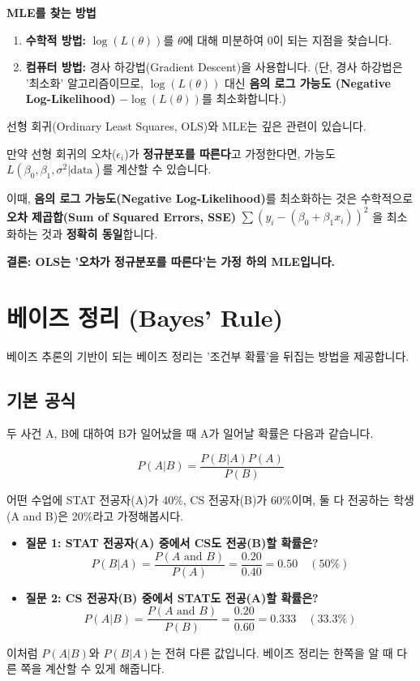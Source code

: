 \documentclass[11pt,a4paper]{book}
\theoremstyle{definition}
\begin{document}
\textbf{MLE를 찾는 방법}
\begin{enumerate}
    \item \textbf{수학적 방법:} $\log(L(\theta))$를 $\theta$에 대해 미분하여 0이 되는 지점을 찾습니다.
    \item \textbf{컴퓨터 방법:} 경사 하강법(Gradient Descent)을 사용합니다.
        (단, 경사 하강법은 '최소화' 알고리즘이므로, $\log(L(\theta))$ 대신 \textbf{음의 로그 가능도 (Negative Log-Likelihood)} $-\log(L(\theta))$를 최소화합니다.)
\end{enumerate}

\begin{summarybox}[title=OLS와 MLE의 중요한 관계]
    선형 회귀(Ordinary Least Squares, OLS)와 MLE는 깊은 관련이 있습니다.

    만약 선형 회귀의 오차($\epsilon_i$)가 \textbf{정규분포를 따른다}고 가정한다면,
    가능도 $L(\beta_0, \beta_1, \sigma^2 | \text{data})$를 계산할 수 있습니다.

    이때, \textbf{음의 로그 가능도(Negative Log-Likelihood)}를 최소화하는 것은
    수학적으로 \textbf{오차 제곱합(Sum of Squared Errors, SSE)} $\sum (y_i - (\beta_0 + \beta_1 x_i))^2$ 을 최소화하는 것과 \textbf{정확히 동일}합니다.

    \textbf{결론: OLS는 '오차가 정규분포를 따른다'는 가정 하의 MLE입니다.}
\end{summarybox}


\section{베이즈 정리 (Bayes' Rule)}

베이즈 추론의 기반이 되는 베이즈 정리는 '조건부 확률'을 뒤집는 방법을 제공합니다.

\subsection{기본 공식}

두 사건 A, B에 대하여 B가 일어났을 때 A가 일어날 확률은 다음과 같습니다.

$$ P(A|B) = \frac{P(B|A) P(A)}{P(B)} $$

\begin{examplebox}[title=CS 전공자 vs. STAT 전공자]
    어떤 수업에 STAT 전공자(A)가 40\%, CS 전공자(B)가 60\%이며, 둘 다 전공하는 학생(A and B)은 20\%라고 가정해봅시다.

    \begin{itemize}
        \item \textbf{질문 1: STAT 전공자(A) 중에서 CS도 전공(B)할 확률은?}
            $$ P(B|A) = \frac{P(A \text{ and } B)}{P(A)} = \frac{0.20}{0.40} = 0.50 \quad (50\%) $$
        \item \textbf{질문 2: CS 전공자(B) 중에서 STAT도 전공(A)할 확률은?}
            $$ P(A|B) = \frac{P(A \text{ and } B)}{P(B)} = \frac{0.20}{0.60} = 0.333 \quad (33.3\%) $$
    \end{itemize}
    이처럼 $P(A|B)$와 $P(B|A)$는 전혀 다른 값입니다. 베이즈 정리는 한쪽을 알 때 다른 쪽을 계산할 수 있게 해줍니다.
\end{examplebox}
\end{document}
